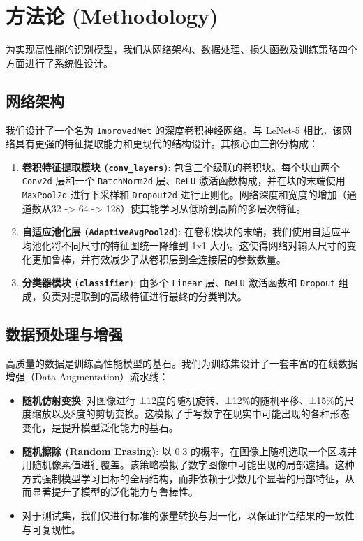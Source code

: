 \documentclass[UTF8]{ctexart}
\begin{document}
\section{方法论 (Methodology)}

为实现高性能的识别模型，我们从网络架构、数据处理、损失函数及训练策略四个方面进行了系统性设计。

\subsection{网络架构}

我们设计了一个名为 \texttt{ImprovedNet} 的深度卷积神经网络。与 LeNet-5 相比，该网络具有更强的特征提取能力和更现代的结构设计。其核心由三部分构成：

\begin{enumerate}
    \item \textbf{卷积特征提取模块 (\texttt{conv\_layers})}: 包含三个级联的卷积块。每个块由两个 \texttt{Conv2d} 层和一个 \texttt{BatchNorm2d} 层、\texttt{ReLU} 激活函数构成，并在块的末端使用 \texttt{MaxPool2d} 进行下采样和 \texttt{Dropout2d} 进行正则化。网络深度和宽度的增加（通道数从32 -> 64 -> 128）使其能学习从低阶到高阶的多层次特征。
    \item \textbf{自适应池化层 (\texttt{AdaptiveAvgPool2d})}: 在卷积模块的末端，我们使用自适应平均池化将不同尺寸的特征图统一降维到 1x1 大小。这使得网络对输入尺寸的变化更加鲁棒，并有效减少了从卷积层到全连接层的参数数量。
    \item \textbf{分类器模块 (\texttt{classifier})}: 由多个 \texttt{Linear} 层、\texttt{ReLU} 激活函数和 \texttt{Dropout} 组成，负责对提取到的高级特征进行最终的分类判决。
\end{enumerate}

\subsection{数据预处理与增强}

高质量的数据是训练高性能模型的基石。我们为训练集设计了一套丰富的在线数据增强（Data Augmentation）流水线：

\begin{itemize}
    \item \textbf{随机仿射变换}: 对图像进行 ±12度的随机旋转、±12\%的随机平移、±15\%的尺度缩放以及8度的剪切变换。这模拟了手写数字在现实中可能出现的各种形态变化，是提升模型泛化能力的基石。
    \item \textbf{随机擦除 (Random Erasing)}: 以 0.3 的概率，在图像上随机选取一个区域并用随机像素值进行覆盖。该策略模拟了数字图像中可能出现的局部遮挡。这种方式强制模型学习目标的全局结构，而非依赖于少数几个显著的局部特征，从而显著提升了模型的泛化能力与鲁棒性。
    \item 对于测试集，我们仅进行标准的张量转换与归一化，以保证评估结果的一致性与可复现性。
\end{itemize}
\end{document}
